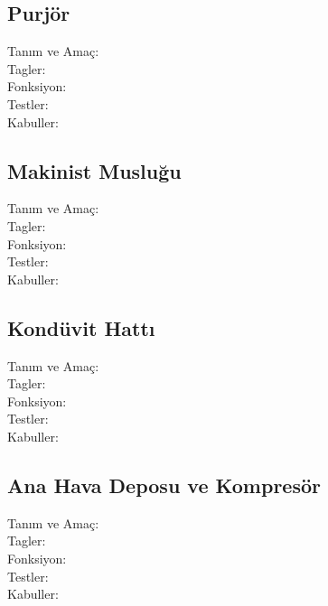 \documentclass[10pt,a4paper]{article}
\begin{document}
\subsection{Purjör}
\begin{description}
\item[Tanım ve Amaç:] 
\item[Tagler:]
\item[Fonksiyon:]
\item[Testler:]
\item[Kabuller:]
\end{description}
\newpage

\subsection{Makinist Musluğu}
\begin{description}
\item[Tanım ve Amaç:] 
\item[Tagler:]
\item[Fonksiyon:]
\item[Testler:]
\item[Kabuller:]
\end{description}
\newpage

\subsection{Kondüvit Hattı}
\begin{description}
\item[Tanım ve Amaç:] 
\item[Tagler:]
\item[Fonksiyon:]
\item[Testler:]
\item[Kabuller:]
\end{description}
\newpage

\subsection{Ana Hava Deposu ve Kompresör}
\begin{description}
\item[Tanım ve Amaç:] 
\item[Tagler:]
\item[Fonksiyon:]
\item[Testler:]
\item[Kabuller:]
\end{description}

\newpage
\end{document}
